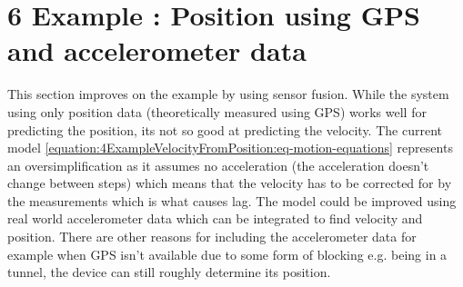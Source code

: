 \documentclass[letterpaper,10pt,english]{jupyterBook}
\begin{document}
\sphinxstepscope


\chapter{6 Example : Position using GPS and accelerometer data}
\label{\detokenize{6ExtendedKalman:example-position-using-gps-and-accelerometer-data}}\label{\detokenize{6ExtendedKalman::doc}}
\sphinxAtStartPar
This section improves on the {\hyperref[\detokenize{6ExtendedKalman:4bExampleVelocityFromPosition.md}]{}} example by using sensor fusion. While the system using only position data (theoretically measured using GPS) works well for predicting the position, its not so good at predicting the velocity. The current model \eqref{equation:4ExampleVelocityFromPosition:eq-motion-equations} represents an oversimplification as it assumes no acceleration (the acceleration doesn’t change between steps) which means that the velocity has to be corrected for by the measurements which is what causes lag. The model could be improved using real world accelerometer data which can be integrated to find velocity and position. There are other reasons for including the accelerometer data for example when GPS isn’t available due to some form of blocking e.g. being in a tunnel, the device can still roughly determine its position.
\end{document}
